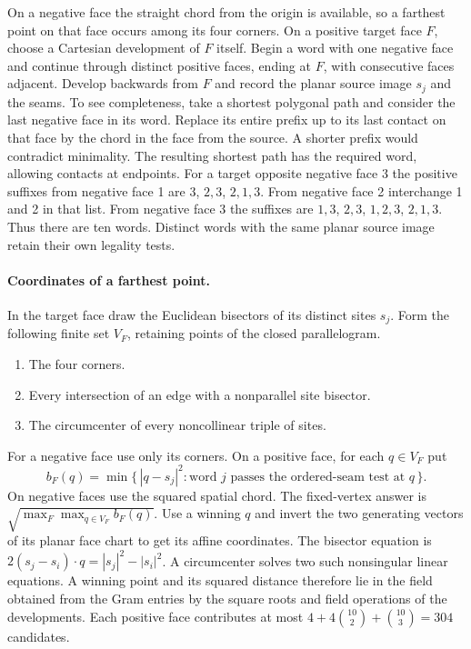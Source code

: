 \documentclass[10pt,letterpaper]{article}
\begin{document}
On a negative face the straight chord from the origin is available, so
a farthest point on that face occurs among its four corners. On a
positive target face $F$, choose a Cartesian development of $F$ itself.
Begin a word with one negative face and continue through distinct
positive faces, ending at $F$, with consecutive faces adjacent. Develop
backwards from $F$ and record the planar source image $s_j$ and the seams.
To see completeness, take a shortest polygonal path and consider the
last negative face in its word. Replace its entire prefix up to its
last contact on that face by the chord in the face from the source.
A shorter prefix would contradict minimality. The resulting shortest
path has the required word, allowing contacts at endpoints. For a
target opposite negative face 3 the positive suffixes from negative
face 1 are $3$, $2,3$, $2,1,3$. From negative face 2 interchange 1
and 2 in that list. From negative face 3 the suffixes are $1,3$,
$2,3$, $1,2,3$, $2,1,3$. Thus there are ten words. Distinct words
with the same planar source image retain their own legality tests.

\paragraph{Coordinates of a farthest point.}
In the target face draw the Euclidean bisectors of its distinct sites
$s_j$. Form the following finite set $V_F$, retaining points of the
closed parallelogram.
\begin{enumerate}
\item The four corners.
\item Every intersection of an edge with a nonparallel site bisector.
\item The circumcenter of every noncollinear triple of sites.
\end{enumerate}
For a negative face use only its corners. On a positive face, for each
$q\in V_F$ put
\[
 b_F(q)=\min\{\,|q-s_j|^2:\text{word $j$ passes the ordered-seam test at $q$}\,\}.
\]
On negative faces use the squared spatial chord. The fixed-vertex answer
is $\sqrt{\max_F\max_{q\in V_F} b_F(q)}$. Use a winning $q$ and invert
the two generating vectors of its planar face chart to get its affine
coordinates. The bisector equation is
$2(s_j-s_i)\cdot q=|s_j|^2-|s_i|^2$. A circumcenter solves two such
nonsingular linear equations. A winning point and its squared distance
therefore lie in the field obtained from the Gram entries by the square
roots and field operations of the developments. Each positive face
contributes at most $4+4\binom{10}{2}+\binom{10}{3}=304$ candidates.
\end{document}
